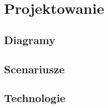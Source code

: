 \newpage
\section{Projektowanie}	
\subsection{Diagramy}
\subsection{Scenariusze}
\subsection{Technologie}